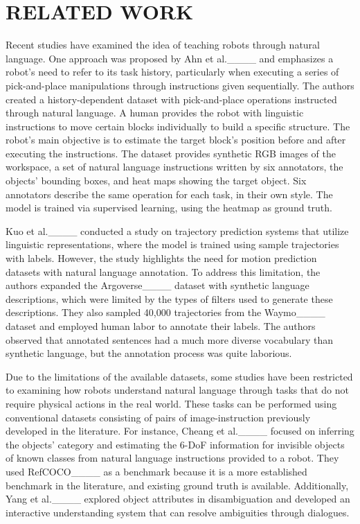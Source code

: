 \section{RELATED WORK}
Recent studies have examined the idea of teaching robots through natural language. One approach was proposed by Ahn et al.____ and emphasizes a robot's need to refer to its task history, particularly when executing a series of pick-and-place manipulations through instructions given sequentially. The authors created a history-dependent dataset with pick-and-place operations instructed through natural language. A human provides the robot with linguistic instructions to move certain blocks individually to build a specific structure. The robot's main objective is to estimate the target block's position before and after executing the instructions. The dataset provides synthetic RGB images of the workspace, a set of natural language instructions written by six annotators, the objects' bounding boxes, and heat maps showing the target object. Six annotators describe the same operation for each task, in their own style. The model is trained via supervised learning, using the heatmap as ground truth.

Kuo et al.____ conducted a study on trajectory prediction systems that utilize linguistic representations, where the model is trained using sample trajectories with labels. However, the study highlights the need for motion prediction datasets with natural language annotation. To address this limitation, the authors expanded the Argoverse____ dataset with synthetic language descriptions, which were limited by the types of filters used to generate these descriptions. They also sampled 40,000 trajectories from the Waymo____ dataset and employed human labor to annotate their labels. The authors observed that annotated sentences had a much more diverse vocabulary than synthetic language, but the annotation process was quite laborious. 

Due to the limitations of the available datasets, some studies have been restricted to examining how robots understand natural language through tasks that do not require physical actions in the real world. These tasks can be performed using conventional datasets consisting of pairs of image-instruction previously developed in the literature. For instance, Cheang et al.____ focused on inferring the objects' category and estimating the 6-DoF information for invisible objects of known classes from natural language instructions provided to a robot. They used RefCOCO____ as a benchmark because it is a more established benchmark in the literature, and existing ground truth is available. Additionally, Yang et al.____ explored object attributes in disambiguation and developed an interactive understanding system that can resolve ambiguities through dialogues.

